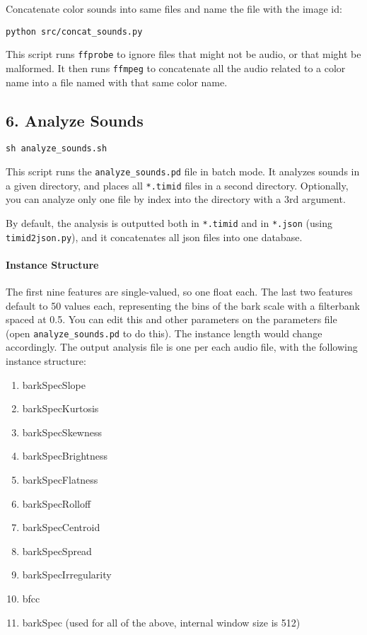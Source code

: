 Concatenate color sounds into same files and name the file with the image id:

\texttt{python\ src/concat\_sounds.py}

This script runs \texttt{ffprobe} to ignore files that might not be audio, or that might be malformed. It then runs \texttt{ffmpeg} to concatenate all the audio related to a color name into a file named with that same color name.




\subsection*{6. Analyze Sounds}

\texttt{sh\ analyze\_sounds.sh}

This script runs the \texttt{analyze\_sounds.pd} file in batch mode. It analyzes sounds in a given directory, and places all \texttt{*.timid} files in a second directory. Optionally, you can analyze only one file by index into the directory with a 3rd argument.

By default, the analysis is outputted both in \texttt{*.timid} and in \texttt{*.json} (using \texttt{timid2json.py}), and it concatenates all \gls{json} files into one database.


\paragraph{Instance Structure}

The first nine features are single-valued, so one float each. The last two features default to 50 values each, representing the bins of the bark scale with a filterbank spaced at 0.5. You can edit this and other parameters on the parameters file (open \texttt{analyze\_sounds.pd} to do this). The instance length would change accordingly. The output analysis file is one per each audio file, with the following instance structure:

\begin{enumerate}
\def\labelenumi{\arabic{enumi}.}
  \singlespacing
  \singlespacing
\tightlist
\item
  barkSpecSlope
\item
  barkSpecKurtosis
\item
  barkSpecSkewness
\item
  barkSpecBrightness
\item
  barkSpecFlatness
\item
  barkSpecRolloff
\item
  barkSpecCentroid
\item
  barkSpecSpread
\item
  barkSpecIrregularity
\item
  bfcc
\item
  barkSpec (used for all of the above, internal window size is 512)
\end{enumerate}

